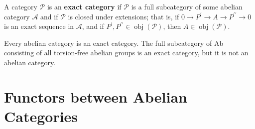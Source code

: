\documentclass[12pt, oneside]{book}
\begin{document}
\begin{definition}
    A category $\mathcal{P}$ is an \textbf{exact category} if $\mathcal{P}$ is a full subcategory of some abelian category $\mathcal{A}$ and if $\mathcal{P}$ is closed under extensions; that is, if $0 \rightarrow P^{\prime} \rightarrow A \rightarrow P^{\prime \prime} \rightarrow 0$ is an exact sequence in $\mathcal{A}$, and if $P^{\prime}, P^{\prime \prime} \in \operatorname{obj}(\mathcal{P})$, then $A \in \operatorname{obj}(\mathcal{P})$.

    Every abelian category is an exact category. The full subcategory of Ab consisting of all torsion-free abelian groups is an exact category, but it is not an abelian category.
\end{definition}

\section{Functors between Abelian Categories}
\end{document}
